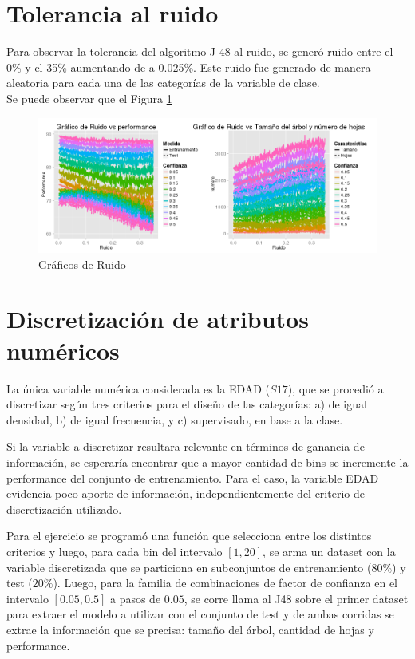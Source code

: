 \documentclass[]{article}
\begin{document}
\section{Tolerancia al ruido}
Para observar la tolerancia del algoritmo J-48 al ruido, se generó ruido entre el 0\% y el 35\% aumentando de a 0.025\%. Este ruido fue generado de manera aleatoria para cada una de las categorías de la variable de clase. \\

Se puede observar que el 
Figura \ref{3.P3Ruido}

\begin{figure}[H]
	\includegraphics[scale = 0.38]{3_1_Ruido}
	\caption[Ruido]{Gráficos de Ruido}
	\label{3.P3Ruido}
\end{figure}

\section{Discretización de atributos numéricos}
La única variable numérica considerada es la EDAD ($S17$), que se procedió a discretizar según tres criterios para el diseño de las categorías: a) de igual densidad, b) de igual frecuencia, y c) supervisado, en base a la clase.

Si la variable a discretizar resultara relevante en términos de ganancia de información, se esperaría encontrar que a mayor cantidad de bins se incremente la performance del conjunto de entrenamiento. Para el caso, la variable EDAD evidencia poco aporte de información, independientemente del criterio de discretización utilizado. 

Para el ejercicio se programó una función que selecciona entre los distintos criterios y luego, para cada bin del intervalo $[1,20]$, se arma un dataset con la variable discretizada que se particiona en subconjuntos de entrenamiento ($80\%$) y test ($20\%$). Luego, para la familia de combinaciones de factor de confianza en el intervalo $[0.05,0.5]$ a pasos de $0.05$, se corre llama al J48 sobre el primer dataset para extraer el modelo a utilizar con el conjunto de test y de ambas corridas se extrae la información que se precisa: tamaño del árbol, cantidad de hojas y performance.
\end{document}
